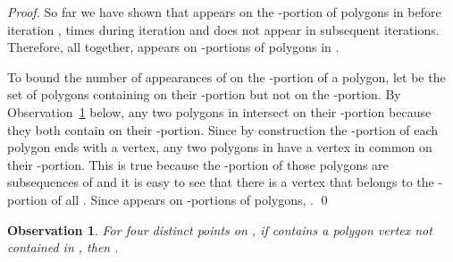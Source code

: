 \documentclass{llncs}
\newtheorem{obs}{Observation}
\begin{document}
\begin{proof}
So far we have shown that  appears on the -portion of  polygons in  before iteration ,  times during iteration  and does not appear in subsequent iterations.  Therefore, all together,  appears on  -portions of  polygons in .

To bound the number of appearances of  on the -portion of a polygon, let  be the set of polygons containing  on their -portion but not on the -portion.  By Observation~\ref{obsPath} below, any two polygons in  intersect on their -portion because they both contain  on their -portion. Since by construction the -portion of each polygon  ends with a vertex, any two polygons in  have a vertex in common on their -portion.  This is true because the -portion of those polygons are subsequences of  and it is easy to see that there is a vertex  that belongs to the -portion of  all .  Since  appears on  -portions of  polygons, .
\qed
\end{proof}

\begin{obs}
For  four distinct points on , if  contains a polygon vertex not contained in , then . 
\label{obsPath}
\end{obs}
\end{document}
